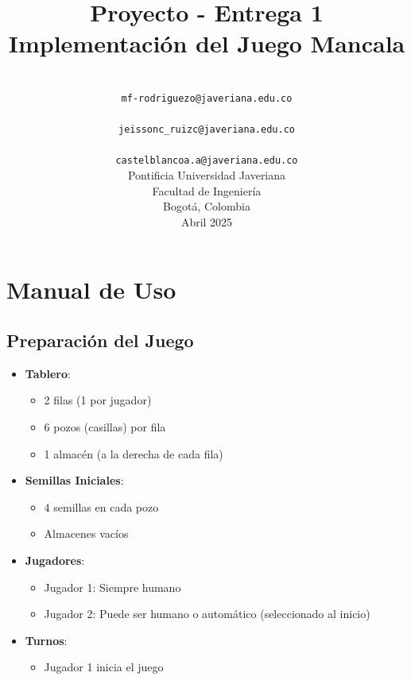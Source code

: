 \documentclass{article}
\title{
    \vspace*{3cm}
    \textbf{Proyecto - Entrega 1}\\
    \large Implementación del Juego Mancala
}
\author{
    \text{María Fernanda Rodríguez Ospina} \\
    \small\texttt{mf-rodriguezo@javeriana.edu.co}
    \vspace{3mm}
    \\
    \text{Jeisson Camilo Ruiz Cristancho} \\
    \small\texttt{jeissonc\_ruizc@javeriana.edu.co}
    \vspace{3mm}
    \\
    \text{Alejandro Castelblanco Arias} \\
    \small\texttt{castelblancoa.a@javeriana.edu.co}
    \vspace{1cm}
    \\
    \large Pontificia Universidad Javeriana \\
    \small Facultad de Ingeniería \\
    \small Bogotá, Colombia \\
    \small Abril 2025
}
\date{}
\begin{document}
\maketitle
\thispagestyle{empty}
\clearpage



\section{Manual de Uso}

\subsection{Preparación del Juego}
\begin{itemize}
    \item \textbf{Tablero}:
    \begin{itemize}
        \item 2 filas (1 por jugador)
        \item 6 pozos (casillas) por fila
        \item 1 almacén (a la derecha de cada fila)
    \end{itemize}
    
    \item \textbf{Semillas Iniciales}:
    \begin{itemize}
        \item 4 semillas en cada pozo
        \item Almacenes vacíos
    \end{itemize}
    
    \item \textbf{Jugadores}:
    \begin{itemize}
        \item Jugador 1: Siempre humano
        \item Jugador 2: Puede ser humano o automático (seleccionado al inicio)
    \end{itemize}
    
    \item \textbf{Turnos}:
    \begin{itemize}
        \item Jugador 1 inicia el juego
    \end{itemize}
\end{itemize}
\end{document}
